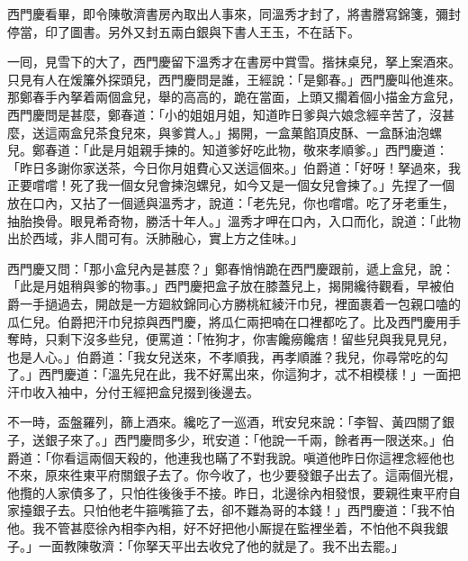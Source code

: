 西門慶看畢，即令陳敬濟書房內取出人事來，同溫秀才封了，將書謄寫錦箋，彌封停當，印了圖書。另外又封五兩白銀與下書人王玉，不在話下。

一囘，見雪下的大了，西門慶留下溫秀才在書房中賞雪。揩抹桌兒，拏上案酒來。只見有人在煖簾外探頭兒，西門慶問是誰，王經說：「是鄭春。」西門慶叫他進來。那鄭春手內拏着兩個盒兒，舉的高高的，跪在當面，上頭又擱着個小描金方盒兒，西門慶問是甚麼，鄭春道：「小的姐姐月姐，知道昨日爹與六娘念經辛苦了，沒甚麼，送這兩盒兒茶食兒來，與爹賞人。」揭開，一盒菓餡頂皮酥、一盒酥油泡螺兒。鄭春道：「此是月姐親手揀的。知道爹好吃此物，敬來孝順爹。」西門慶道：「昨日多謝你家送茶，今日你月姐費心又送這個來。」伯爵道：「好呀！拏過來，我正要嚐嚐！死了我一個女兒會揀泡螺兒，如今又是一個女兒會揀了。」先捏了一個放在口內，又拈了一個遞與溫秀才，說道：「老先兒，你也嚐嚐。吃了牙老重生，抽胎換骨。眼見希奇物，勝活十年人。」{}溫秀才呷在口內，入口而化，說道：「此物出於西域，非人間可有。沃肺融心，實上方之佳味。」

西門慶又問：「那小盒兒內是甚麼？」鄭春悄悄跪在西門慶跟前，遞上盒兒，說：「此是月姐稍與爹的物事。」西門慶把盒子放在膝蓋兒上，揭開纔待觀看，早被伯爵一手撾過去，開啟是一方廻紋錦同心方勝桃紅綾汗巾兒，裡面裹着一包親口嗑的瓜仁兒。伯爵把汗巾兒掠與西門慶，將瓜仁兩把喃在口裡都吃了。比及西門慶用手奪時，只剩下沒多些兒，{}便罵道：「恠狗才，你害饞癆饞痞！留些兒與我見見兒，也是人心。」伯爵道：「我女兒送來，不孝順我，再孝順誰？我兒，你尋常吃的勾了。」{}西門慶道：「溫先兒在此，我不好罵出來，你這狗才，忒不相模樣！」一面把汗巾收入袖中，分付王經把盒兒掇到後邊去。

不一時，盃盤羅列，篩上酒來。纔吃了一巡酒，玳安兒來說：「李智、黃四關了銀子，送銀子來了。」西門慶問多少，玳安道：「他說一千兩，餘者再一限送來。」伯爵道：「你看這兩個天殺的，他連我也瞞了不對我說。嗔道他昨日你這裡念經他也不來，原來徃東平府關銀子去了。你今收了，也少要發銀子出去了。這兩個光棍，他攬的人家債多了，只怕徃後後手不接。昨日，北邊徐內相發恨，要親徃東平府自家擡銀子去。只怕他老牛箍嘴箍了去，卻不難為哥的本錢！」{}西門慶道：「我不怕他。我不管甚麼徐內相李內相，好不好把他小厮提在監裡坐着，不怕他不與我銀子。」一面教陳敬濟：「你拏天平出去收兌了他的就是了。我不出去罷。」

